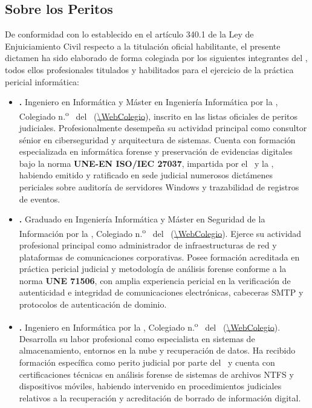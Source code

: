 \subsection{Sobre los Peritos}

De conformidad con lo establecido en el artículo 340.1 de la Ley de Enjuiciamiento Civil respecto a la titulación oficial habilitante, el presente dictamen ha sido elaborado de forma colegiada por los siguientes integrantes del \textbf{\GrupoPracticas}, todos ellos profesionales titulados y habilitados para el ejercicio de la práctica pericial informática:

\begin{itemize}[leftmargin=1.4em, itemsep=0.6em]
	\item \begin{sloppypar}
		\textbf{\PeritoUno.} Ingeniero en Informática y Máster en Ingeniería Informática por la \UniversidadPerito, Colegiado n.\textsuperscript{o} \NumColegiadoUno\ del \ColegioProfesional\ (\url{\WebColegio}), inscrito en las listas oficiales de peritos judiciales. Profesionalmente desempeña su actividad principal como consultor sénior en ciberseguridad y arquitectura de sistemas. Cuenta con formación especializada en informática forense y preservación de evidencias digitales bajo la norma \textbf{UNE-EN ISO/IEC 27037}, impartida por el \ColegioProfesional\ y la \UniversidadPerito, habiendo emitido y ratificado en sede judicial numerosos dictámenes periciales sobre auditoría de servidores Windows y trazabilidad de registros de eventos.
	\end{sloppypar}
	
	\item \begin{sloppypar}
		\textbf{\PeritoDos.} Graduado en Ingeniería Informática y Máster en Seguridad de la Información por la \UniversidadPerito, Colegiado n.\textsuperscript{o} \NumColegiadoDos\ del \ColegioProfesional\ (\url{\WebColegio}). Ejerce su actividad profesional principal como administrador de infraestructuras de red y plataformas de comunicaciones corporativas. Posee formación acreditada en práctica pericial judicial y metodología de análisis forense conforme a la norma \textbf{UNE 71506}, con amplia experiencia pericial en la verificación de autenticidad e integridad de comunicaciones electrónicas, cabeceras SMTP y protocolos de autenticación de dominio.
	\end{sloppypar}
	
	\item \begin{sloppypar}
		\textbf{\PeritoTres.} Ingeniero en Informática por la \UniversidadPerito, Colegiado n.\textsuperscript{o} \NumColegiadoTres\ del \ColegioProfesional\ (\url{\WebColegio}). Desarrolla su labor profesional como especialista en sistemas de almacenamiento, entornos en la nube y recuperación de datos. Ha recibido formación específica como perito judicial por parte del \ColegioProfesional\ y cuenta con certificaciones técnicas en análisis forense de sistemas de archivos NTFS y dispositivos móviles, habiendo intervenido en procedimientos judiciales relativos a la recuperación y acreditación de borrado de información digital.
	\end{sloppypar}
	

\end{itemize}
